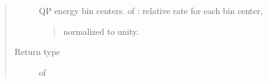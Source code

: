 \documentclass[letterpaper,10pt,english]{sphinxmanual}
\begin{document}
\begin{fulllineitems}
\begin{fulllineitems}
\begin{quote}
\begin{description}
QP energy bin centers.
 of : relative rate for each bin center,
\begin{quote}

normalized to unity.
\end{quote}


\item[{Return type}] \leavevmode
{} of 

\end{description}\end{quote}

\end{fulllineitems}


\end{fulllineitems}

\end{document}
